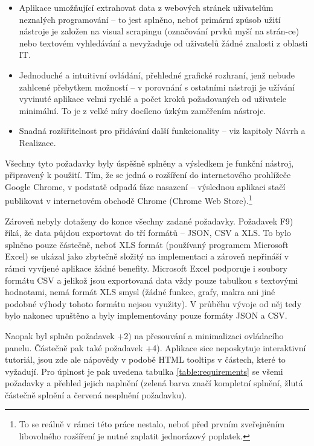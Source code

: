 \documentclass[thesis=B,czech]{FITthesis}[2012/06/26]
\begin{document}
\begin{itemize}
	\item Aplikace umožňující extrahovat data z webových stránek uživatelům neznalých programování -- to jest splněno, neboť primární způsob užití nástroje je založen na visual scrapingu (označování prvků myší na strán-ce) nebo textovém vyhledávání a nevyžaduje od uživatelů žádné znalosti z oblasti IT.
	\item Jednoduché a intuitivní ovládání, přehledné grafické rozhraní, jenž nebude zahlcené přebytkem možností -- v porovnání s ostatními nástroji je užívání vyvinuté aplikace velmi rychlé a počet kroků požadovaných od uživatele minimální. To je z velké míry docíleno úzkým zaměřením nástroje. 
	\item Snadná rozšiřitelnost pro přidávání další funkcionality -- viz kapitoly Návrh a Realizace.
\end{itemize}

Všechny tyto požadavky byly úspěšně splněny a výsledkem je funkční nástroj, připravený k použití. Tím, že se jedná o rozšíření do internetového prohlížeče Google Chrome, v podstatě odpadá fáze nasazení -- výslednou aplikaci stačí publikovat v internetovém obchodě Chrome (Chrome Web Store).\footnote{To se reálně v rámci této práce nestalo, neboť před prvním zveřejněním libovolného rozšíření je nutné zaplatit jednorázový poplatek.}

Zároveň nebyly dotaženy do konce všechny zadané požadavky. Požadavek F9) říká, že data půjdou exportovat do tří formátů -- JSON, CSV a XLS. To bylo splněno pouze částečně, neboť XLS formát (používaný programem Microsoft Excel) se ukázal jako zbytečně složitý na implementaci a zároveň nepřináší v rámci vyvíjené aplikace žádné benefity. Microsoft Excel podporuje i soubory formátu CSV a jelikož jsou exportovaná data vždy pouze tabulkou s textovými hodnotami, nemá formát XLS smysl (žádné funkce, grafy, makra ani jiné podobné výhody tohoto formátu nejsou využity). V průběhu vývoje od něj tedy bylo nakonec upuštěno a byly implementovány pouze formáty JSON a CSV.

Naopak byl splněn požadavek +2) na přesouvání a minimalizaci ovládacího panelu. Částečně pak také požadavek +4). Aplikace sice neposkytuje interaktivní tutoriál, jsou zde ale nápovědy v podobě HTML tooltips v částech, které to vyžadují. Pro úplnost je pak uvedena tabulka \ref{table:requirements} se všemi požadavky a přehled jejich naplnění (zelená barva značí kompletní splnění, žlutá částečně splnění a červená nesplnění požadavku).
\end{document}
